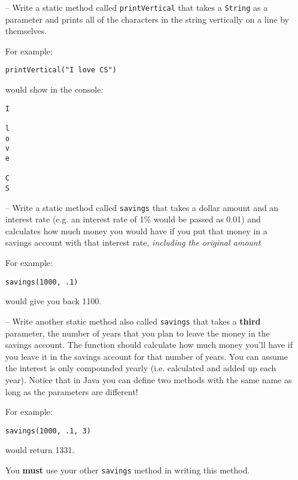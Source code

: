 \documentclass[11pt]{article}
\begin{document}
\begin{itemize}

\item [--] Write a static method called \texttt{printVertical} that takes a \texttt{String} as a parameter and prints all of the characters in the string vertically on a line by themselves.

For example:

\begin{verbatim}
printVertical("I love CS")
\end{verbatim}

would show in the console:

\begin{verbatim}
I

l
o
v
e

C
S
\end{verbatim}

\item [--] Write a static method called \texttt{savings} that takes a dollar amount and an interest rate (e.g. an interest rate of 1\% would be passed as 0.01) and calculates how much money you would have if you put that money in a savings account with that interest rate,  \emph{including the original amount} 

For example:

\begin{verbatim}
savings(1000, .1)
\end{verbatim}

would give you back 1100.

\item [--] Write another static method also called \texttt{savings} that takes a \textbf{third} parameter, the number of years that you plan to leave the money in the savings account.  The function should calculate how much money you'll have if you leave it in the savings account for that number of years.  You can assume the interest is only compounded yearly (i.e. calculated and added up each year).  Notice that in Java you can define two methods with the same name as long as the parameters are different!

For example:

\begin{verbatim}
savings(1000, .1, 3)
\end{verbatim}

would return 1331.

You \textbf{must} use your other \texttt{savings} method in writing this method.


\end{itemize}
\end{document}
